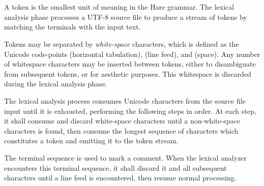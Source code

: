 
\begin{grammar}
\\
	 \\
\end{grammar}

\specsubitem
A token is the smallest unit of meaning in the Hare grammar. The lexical
analysis phase processes a UTF-8 source file to produce a stream of tokens by
matching the terminals with the input text.

\specsubitem
Tokens may be separated by \textit{white-space} characters, which is defined as
the Unicode code-points  (horizontal tabulation), 
(line feed), and  (space). Any number of whitespace characters may
be inserted between tokens, either to disambiguate from subsequent tokens, or
for aesthetic purposes. This whitespace is discarded during the lexical
analysis phase.



\specsubitem
The lexical analysis process consumes Unicode characters from the source file
input until it is exhausted, performing the following steps in order. At each
step, it shall consume and discard white-space characters until a
non-white-space characters is found, then consume the longest sequence of
characters which constitutes a token and emitting it to the token stream.

\specsubitem
The terminal sequence \terminal{//} is used to mark a comment. When the lexical
analyzer encounters this terminal sequence, it shall discard it and all
subsequent characters until a line feed  is encountered, then
resume normal processing.
